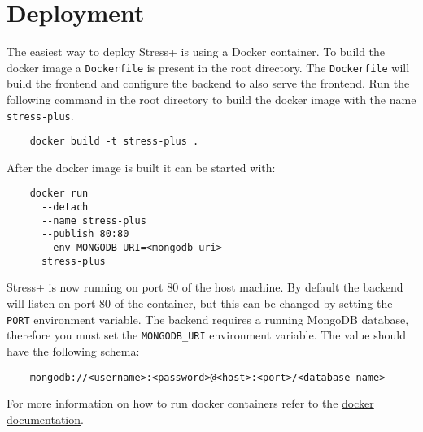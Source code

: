\section{Deployment}
\label{sec:deployment}

The easiest way to deploy Stress+ is using a Docker container.
To build the docker image a \texttt{Dockerfile} is present in the root directory. 
The \texttt{Dockerfile} will build the frontend and configure the backend to also serve the frontend. 
Run the following command in the root directory to build the docker image with the name \texttt{stress-plus}.
\begin{verbatim}
    docker build -t stress-plus .
\end{verbatim}
After the docker image is built it can be started with:
\begin{verbatim}
    docker run 
      --detach 
      --name stress-plus 
      --publish 80:80 
      --env MONGODB_URI=<mongodb-uri> 
      stress-plus
\end{verbatim}
Stress+ is now running on port $80$ of the host machine.
By default the backend will listen on port $80$ of the container, but this can be changed by setting the \texttt{PORT} environment variable.
The backend requires a running MongoDB database, therefore you must set the \texttt{MONGODB\_URI} environment variable. 
The value should have the following schema:
\begin{verbatim}
    mongodb://<username>:<password>@<host>:<port>/<database-name>
\end{verbatim}

For more information on how to run docker containers refer to the \href{https://docs.docker.com/engine/reference/commandline/run}{docker documentation}.
